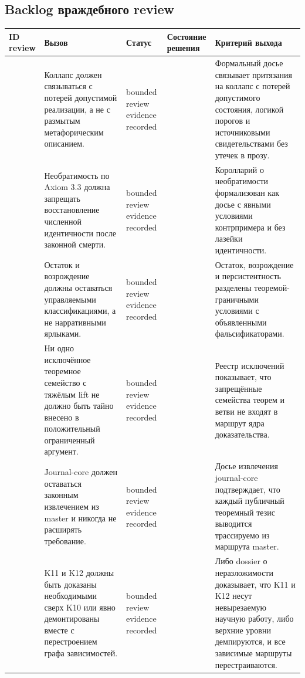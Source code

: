 \subsection{Backlog враждебного review}
\begin{center}
\begin{tabular}{@{}L{0.18\textwidth}L{0.25\textwidth}L{0.11\textwidth}L{0.15\textwidth}L{0.23\textwidth}@{}}
\toprule
ID review & Вызов & Статус & Состояние решения & Критерий выхода \\
\midrule
{} & Коллапс должен связываться с потерей допустимой реализации, а не с размытым метафорическим описанием. & bounded review evidence recorded &  & Формальный досье связывает притязания на коллапс с потерей допустимого состояния, логикой порогов и источниковыми свидетельствами без утечек в прозу. \\
 & Необратимость по Axiom 3.3 должна запрещать восстановление численной идентичности после законной смерти. & bounded review evidence recorded &  & Королларий о необратимости формализован как досье с явными условиями контрпримера и без лазейки идентичности. \\
 & Остаток и возрождение должны оставаться управляемыми классификациями, а не нарративными ярлыками. & bounded review evidence recorded &  & Остаток, возрождение и персистентность разделены теоремой-граничными условиями с объявленными фальсификаторами. \\
 & Ни одно исключённое теоремное семейство с тяжёлым lift не должно быть тайно внесено в положительный ограниченный аргумент. & bounded review evidence recorded &  & Реестр исключений показывает, что запрещённые семейства теорем и ветви не входят в маршрут ядра доказательства. \\
 & Journal-core должен оставаться законным извлечением из master и никогда не расширять требование. & bounded review evidence recorded &  & Досье извлечения journal-core подтверждает, что каждый публичный теоремный тезис выводится трассируемо из маршрута master. \\
 & K11 и K12 должны быть доказаны необходимыми сверх K10 или явно демонтированы вместе с перестроением графа зависимостей. & bounded review evidence recorded &  & Либо dossier о неразложимости доказывает, что K11 и K12 несут невырезаемую научную работу, либо верхние уровни демпируются, и все зависимые маршруты перестраиваются. \\
\bottomrule
\end{tabular}
\end{center}

